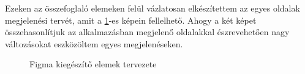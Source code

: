 Ezeken az összefoglaló elemeken felül vázlatosan elkészítettem az egyes oldalak megjelenési tervét, amit a \ref{fig.picture-11}-es képein fellelhető. Ahogy a két képet összehasonlítjuk az alkalmazásban megjelenő oldalakkal észrevehetően nagy változásokat eszközöltem egyes megjelenéseken.
\begin{figure}[H]
	\centering
	\hspace{5pt}
	\caption{Figma kiegészítő elemek tervezete}
	\label{fig.picture-11}
\end{figure}

